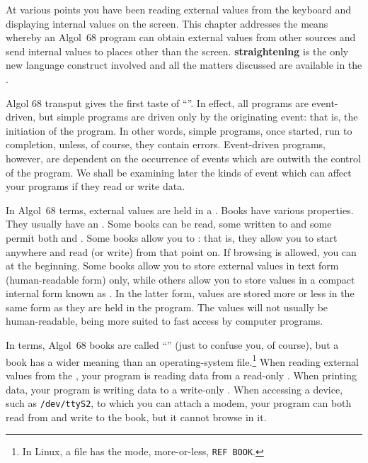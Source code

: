 %
%
%
%
At various points you have been reading external values from the
keyboard and displaying internal values on the screen. This chapter
addresses the means whereby an Algol~68 program can obtain external
values from other sources and send internal values to places other
than the screen.  \textbf{straightening} is the only new language
construct involved and all the matters discussed are available in
the .

Algol 68 transput gives the first taste of
``''.
In effect, all programs are event-driven, but simple programs are
driven only by the originating event: that is, the initiation of the
program.  In other words, simple programs, once started, run to
completion, unless, of course, they contain errors. Event-driven
programs, however, are dependent on the occurrence of events which
are outwith the control of the program. We shall be examining later
the kinds of event which can affect your programs if they read or
write data.

In Algol~68 terms, external values are held in a . Books
have various properties. They usually have an
. Some books can be read,
some written to and some permit both  and .
Some books allow you to : that is, they allow
you to start anywhere and read (or write) from that point on.  If
browsing is allowed, you can  at the beginning. Some
books allow you to store external values in text form (human-readable
form) only, while others allow you to store values in a compact
internal form known as .  In the latter form, values are
stored more or less in the same form as they are held in the program.
The values will not usually be human-readable, being more suited to
fast access by computer programs.

In  terms, Algol~68 books are called
``'' (just to confuse you, of course), but a book has a
wider meaning than an operating-system file.\footnote{In Linux, a
file has the mode, more-or-less, \texttt{REF BOOK}.} When reading
external values from the , your program is reading data
from a read-only .  When printing data,
your program is writing data to a write-only
.  When accessing a device, such as
\verb|/dev/ttyS2|, to which you can attach a modem, your program can
both read from and write to the book, but it cannot browse in it.

